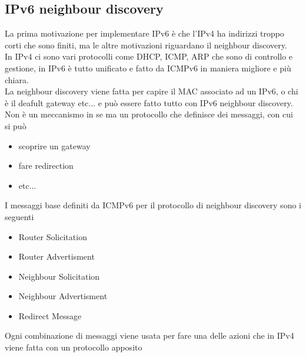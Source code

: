 \documentclass[12pt, oneside]{extbook} %
\begin{document}
\subsection{IPv6 neighbour discovery}
La prima motivazione per implementare IPv6 è che l'IPv4 ha indirizzi troppo corti che sono finiti, ma le altre motivazioni riguardano il neighbour discovery.
\\In IPv4 ci sono vari protocolli come DHCP, ICMP, ARP che sono di controllo e gestione, in IPv6 è tutto unificato e fatto da ICMPv6 in maniera migliore e più chiara.
\\La neighbour discovery viene fatta per capire il MAC associato ad un IPv6, o chi è il deafult gateway etc... e può essere fatto tutto con IPv6 neighbour discovery.
\\Non è un meccanismo in se ma un protocollo che definisce dei messaggi, con cui si può
    \begin{itemize}
        \item scoprire un gateway
        \item fare redirection
        \item etc...
    \end{itemize}
I messaggi base definiti da ICMPv6 per il protocollo di neighbour discovery sono i seguenti
    \begin{itemize}
        \item Router Solicitation
        \item Router Advertisment
        \item Neighbour Solicitation
        \item Neighbour Advertisment
        \item Redirect Message
    \end{itemize}
Ogni combinazione di messaggi viene usata per fare una delle azioni che in IPv4 viene fatta con un protocollo apposito
\end{document}
